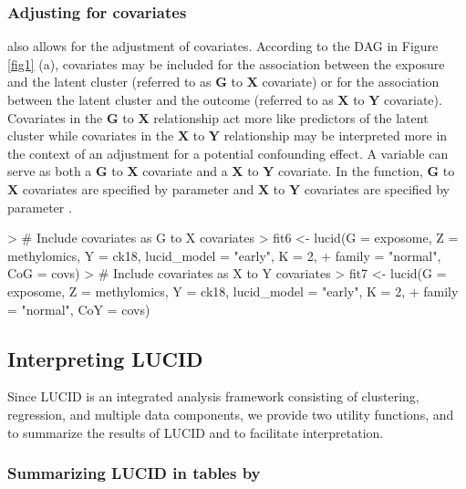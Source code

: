 \subsubsection{Adjusting for covariates} \label{sec3.1.3}

 also allows for the adjustment of covariates. According to the DAG in Figure \ref{fig1} (a), covariates may be included for the association between the exposure and the latent cluster (referred to as $\bm G$ to $\bm X$ covariate) or for the association between the latent cluster and the outcome (referred to as $\bm X$ to $\bm Y$ covariate). Covariates in the $\bm G$ to $\bm X$ relationship act more like predictors of the latent cluster while covariates in the $\bm X$ to $\bm Y$ relationship may be interpreted more in the context of an adjustment for a potential confounding effect. A variable can serve as both a $\bm G$ to $\bm X$ covariate and a $\bm X$ to $\bm Y$ covariate. In the  function, $\bm G$ to $\bm X$ covariates are specified by parameter  and $\bm X$ to $\bm Y$ covariates are specified by parameter .

\begin{example}
> # Include covariates as G to X covariates
> fit6 <- lucid(G = exposome, Z = methylomics, Y = ck18, lucid_model = "early", K = 2, 
+               family = "normal", CoG = covs)
> # Include covariates as X to Y covariates
> fit7 <- lucid(G = exposome, Z = methylomics, Y = ck18, lucid_model = "early", K = 2, 
+               family = "normal", CoY = covs)
\end{example}


\subsection{Interpreting LUCID} \label{section3.2}

Since LUCID is an integrated analysis framework consisting of clustering, regression, and multiple data components, we provide two utility functions,  and  to summarize the results of LUCID and to facilitate interpretation.


\subsubsection{Summarizing LUCID in tables by } 

